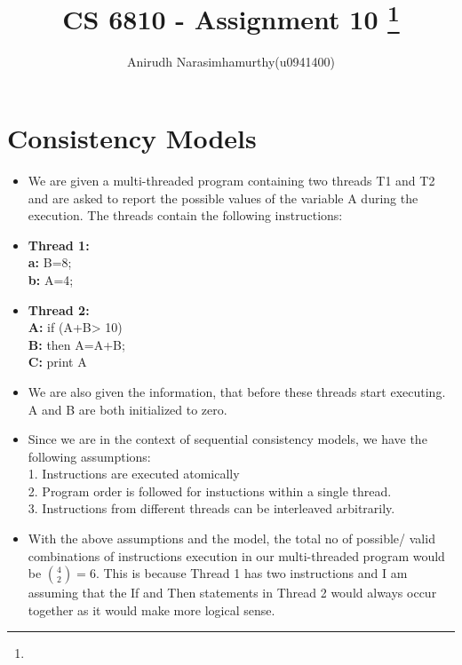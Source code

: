 \documentclass[11pt]{article}
\title{CS 6810 - Assignment 10 
\footnote{\s{CS 6810 ; \;\; Spring 2015 \hfill}
}
}
\author{Anirudh Narasimhamurthy(u0941400)}
\begin{document}
\maketitle

\lstset{language=python} 


\section{Consistency Models}


\begin{itemize}
	
	\item[]  We are given a multi-threaded program containing two threads T1 and T2 and are asked to report the possible values of the variable A during the execution. The threads contain the following instructions:
	
	\item[]  \textbf{Thread 1:}\\
	\textbf{a:} B=8;    \\
	\textbf{b:} A=4;

	\item[] \textbf{Thread 2:}\\
	\textbf{A:} if (A+B> 10)\\
	\textbf{B:} then A=A+B;\\
	\textbf{C:} print A 

	\item[] We are also given the information, that before these threads start executing. A and B are both initialized to zero.
	
	\item[] Since we are in the context of sequential consistency models, we have the following assumptions:\\
	1. Instructions are executed atomically\\
	2. Program order is followed for instuctions within a single thread.\\
	3. Instructions from different threads can be interleaved arbitrarily.
	
	\item[]  With the above assumptions and the model, the total no of possible/ valid combinations of instructions execution in our multi-threaded program would be $\binom{4}{2} = 6$. This is because Thread 1 has two instructions and I am assuming that the If and Then statements in Thread 2 would always occur together as it would make more logical sense.
	

\end{itemize}
\end{document}
